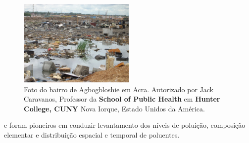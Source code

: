 \begin{figure}[H]
  \centering
  \includegraphics[width=0.5\textwidth]{../inputs/images/ewaste_jack_caravano.jpg}
  \caption{Foto do bairro de Agbogbloshie em Acra. Autorizado por Jack Caravanos, 
           Professor da \textbf{School of Public Health} em \textbf{Hunter College, CUNY}
           Nova Iorque, Estado Unidos da América. \label{fig:ewaste}}
\end{figure}

\citep{ARKU2008} e \citep{DIONISIO2010} foram pioneiros em conduzir  
levantamento dos níveis de poluição, composição elementar e distribuição espacial 
e temporal de poluentes.
